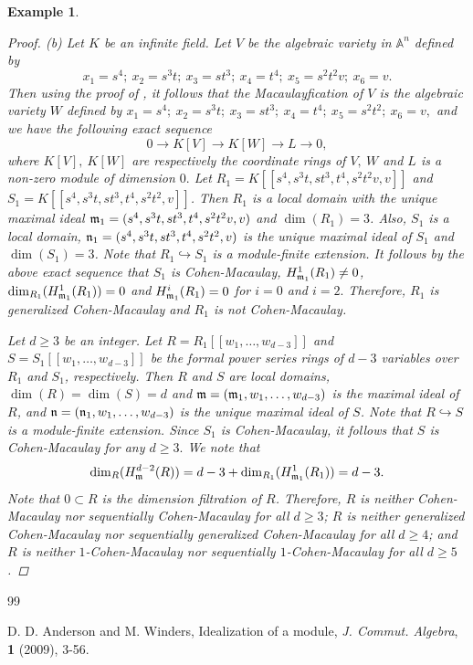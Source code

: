 \documentclass[a4papersize]{article}
\newtheorem{example}[theorem]{Example}
\begin{document}
{\begin{example}
\begin{proof}
(b) Let $K$ be an infinite field. Let $V$ be the algebraic variety in $\mathbb{A}^n$ defined by $$x_1=s^4;~x_2=s^3t;~x_3=st^3;~x_4=t^4;~x_5=s^2t^2v;~x_6=v.$$ Then using the proof of \cite[Example 5.4(i)]{NM}, it follows that the Macaulayfication of $V$ is the algebraic variety $W$ defined by $x_1=s^4;~x_2=s^3t;~x_3=st^3;~x_4=t^4;~x_5=s^2t^2;~x_6=v,$  and we have the following exact sequence $$0\to K[V]\to K[W]\to L\to 0,$$ where $K[V],~ K[W]$ are respectively the coordinate rings of $V,~ W$ and $L$ is a non-zero module of dimension $0.$   Let $R_1=K[[s^4, s^3t, st^3, t^4, s^2t^2v, v]]$ and $S_1=K[[s^4, s^3t, st^3, t^4, s^2t^2, v]]$. Then $R_1$ is a local domain with the unique maximal ideal  $\frak m_1=(s^4, s^3t, st^3, t^4, s^2t^2v, v)$ and $\dim(R_1)=3$. Also,  $S_1$ is a local domain, $\frak n_1=(s^4, s^3t, st^3, t^4, s^2t^2, v)$  is the unique maximal ideal of $S_1$ and $\dim(S_1)=3$. Note that  $R_1\hookrightarrow S_1$  is a module-finite extension. It follows by  the above exact sequence that  $S_1$ is Cohen-Macaulay, $H^1_{\frak m_1}(R_1)\neq 0$, $\dim_{R_1}(H^1_{\frak m_1}(R_1))=0$  and $H^i_{\frak m_1}(R_1)=0$ for $i=0$ and $i=2.$ Therefore, $R_1$  is generalized Cohen-Macaulay and $R_1$  is not Cohen-Macaulay.
			
Let $d\geq 3$ be an integer. Let $R=R_1[[w_1, \ldots , w_{d-3}]]$ and $S=S_1[[w_1, \ldots , w_{d-3}]]$ be the formal power series rings of $d-3$ variables over $R_1$ and $S_1$, respectively.  Then $R$ and $S$ are local domains, $\dim(R)=\dim (S)=d$ and  $\frak m=(\frak m_1,w_1, \ldots , w_{d-3})$ is the maximal ideal of $R$, and  $\frak n=(\frak n_1,w_1, \ldots , w_{d-3})$ is the unique maximal ideal of $S$. Note that  $R\hookrightarrow S$ is a module-finite extension.    Since $S_1$ is Cohen-Macaulay, it follows that $S$ is Cohen-Macaulay for any $d\geq 3.$ We note that $$\dim_R(H^{d-2}_{\frak m}(R))=d-3+\dim_{R_1}(H^1_{\frak m_1}(R_1))=d-3.$$ Note that $0\subset R$ is the dimension filtration of $R$. Therefore, $R$ is neither Cohen-Macaulay nor sequentially Cohen-Macaulay for all $d\geq 3$; $R$ is neither generalized Cohen-Macaulay nor sequentially generalized Cohen-Macaulay for all $d\geq 4$; and $R$ is neither $1$-Cohen-Macaulay nor sequentially $1$-Cohen-Macaulay for all $d\geq 5$.    	
\end{proof}		
\end{example}
		
\begin{thebibliography}{99}
			
 D. D. Anderson and M. Winders, Idealization of a module, {\it J. Commut. Algebra}, {\bf 1} (2009), 3-56.			
	

\end{thebibliography}}
\end{document}
